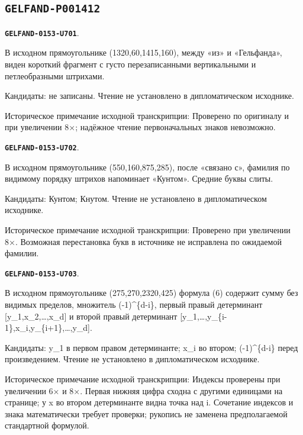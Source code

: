\documentclass[11pt]{article}
\theoremstyle{definition}
\theoremstyle{remark}
\begin{document}
\subsection*{\texttt{GELFAND-P001412}}
\par\noindent\leavevmode{}\label{GELFAND-0153-U701}\label{GELFAND-P001412:top-cancelled:note}\textbf{\texttt{GELFAND-0153-U701}}.\nopagebreak[4]\par
В исходном прямоугольнике (1320,60,1415,160), между «из» и «Гельфанда», виден короткий фрагмент с густо перезаписанными вертикальными и петлеобразными штрихами.\par
Кандидаты: не записаны. Чтение не установлено в дипломатическом исходнике.\par
Историческое примечание исходной транскрипции: Проверено по оригиналу и при увеличении 8×; надёжное чтение первоначальных знаков невозможно.\par\medskip
\par\noindent\leavevmode{}\label{GELFAND-0153-U702}\label{GELFAND-P001412:knuth-name:note}\textbf{\texttt{GELFAND-0153-U702}}.\nopagebreak[4]\par
В исходном прямоугольнике (550,160,875,285), после «связано с», фамилия по видимому порядку штрихов напоминает «Кунтом». Средние буквы слиты.\par
Кандидаты: Кунтом; Кнутом. Чтение не установлено в дипломатическом исходнике.\par
Историческое примечание исходной транскрипции: Проверено при увеличении 8×. Возможная перестановка букв в источнике не исправлена по ожидаемой фамилии.\par\medskip
\par\noindent\leavevmode{}\label{GELFAND-0153-U703}\label{GELFAND-P001412:determinant-formula-source:note}\textbf{\texttt{GELFAND-0153-U703}}.\nopagebreak[4]\par
В исходном прямоугольнике (275,270,2320,425) формула (6) содержит сумму без видимых пределов, множитель (-1)\textasciicircum{}\{d-i\}, первый правый детерминант [y\_1,x\_2,…,x\_d] и второй правый детерминант [y\_1,…,y\_\{i-1\},x\_i,y\_\{i+1\},…,y\_d].\par
Кандидаты: y\_1 в первом правом детерминанте; x\_i во втором; (-1)\textasciicircum{}\{d-i\} перед произведением. Чтение не установлено в дипломатическом исходнике.\par
Историческое примечание исходной транскрипции: Индексы проверены при увеличении 6× и 8×. Первая нижняя цифра сходна с другими единицами на странице; у x во втором детерминанте видна точка над i. Сочетание индексов и знака математически требует проверки; рукопись не заменена предполагаемой стандартной формулой.\par\medskip
\end{document}

